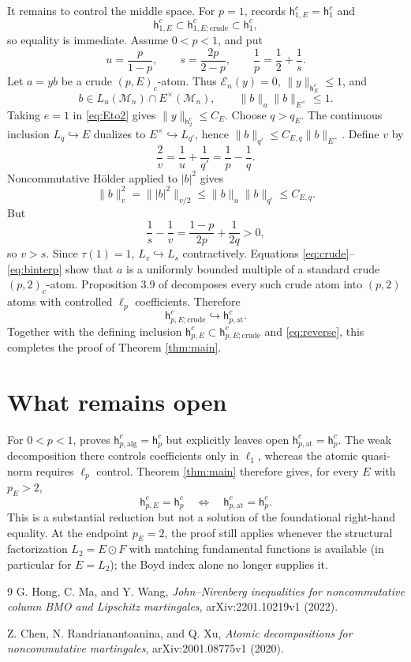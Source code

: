 \documentclass[11pt]{article}
\newcommand{\M}{\mathcal M}
\newcommand{\E}{\mathcal E}
\newcommand{\hpat}{\mathsf h^c_{p,\mathrm{at}}}
\newcommand{\tr}{\tau}
\begin{document}
It remains to control the middle space.  For $p=1$, \cite{HMW} records
$\mathsf h^c_{1,E}=\mathsf h^c_1$ and
\[
 \mathsf h^c_{1,E}\subset
 \mathsf h^c_{1,E;\mathrm{crude}}\subset\mathsf h^c_1,
\]
so equality is immediate.  Assume $0<p<1$, and put
\[
 u=\frac p{1-p},\qquad s=\frac{2p}{2-p},
 \qquad \frac1p=\frac12+\frac1s.
\]
Let $a=yb$ be a crude $(p,E)_c$-atom.  Thus $\E_n(y)=0$,
$\|y\|_{\mathsf h_E^c}\le1$, and
\begin{equation}\label{eq:crude}
 b\in L_u(\M_n)\cap E^\times(\M_n),\qquad
 \|b\|_u\|b\|_{E^\times}\le1.
\end{equation}
Taking $e=1$ in \eqref{eq:Eto2} gives
$\|y\|_{\mathsf h_2^c}\le C_E$.  Choose $q>q_E$.  The continuous inclusion
$L_q\hookrightarrow E$ dualizes to $E^\times\hookrightarrow L_{q'}$, hence
$\|b\|_{q'}\le C_{E,q}\|b\|_{E^\times}$.  Define $v$ by
\[
 \frac2v=\frac1u+\frac1{q'}=\frac1p-\frac1q.
\]
Noncommutative Hölder applied to $|b|^2$ gives
\begin{equation}\label{eq:binterp}
 \|b\|_v^2=\||b|^2\|_{v/2}
 \le\|b\|_u\|b\|_{q'}
 \le C_{E,q}.
\end{equation}
But
\[
 \frac1s-\frac1v=\frac{1-p}{2p}+\frac1{2q}>0,
\]
so $v>s$.  Since $\tr(1)=1$, $L_v\hookrightarrow L_s$ contractively.
Equations \eqref{eq:crude}--\eqref{eq:binterp} show that $a$ is a uniformly
bounded multiple of a standard crude $(p,2)_c$-atom.  Proposition 3.9 of
\cite{CRX} decomposes every such crude atom into $(p,2)$ atoms with controlled
$\ell_p$ coefficients.  Therefore
\[
 \mathsf h^c_{p,E;\mathrm{crude}}\hookrightarrow\hpat.
\]
Together with the defining inclusion
$\mathsf h^c_{p,E}\subset\mathsf h^c_{p,E;\mathrm{crude}}$ and
\eqref{eq:reverse}, this completes the proof of Theorem \ref{thm:main}.

\section{What remains open}

For $0<p<1$, \cite{CRX} proves
$\mathsf h^c_{p,\mathrm{alg}}=\mathsf h^c_p$ but explicitly leaves open
$\hpat=\mathsf h^c_p$.  The weak decomposition there controls coefficients
only in $\ell_1$, whereas the atomic quasi-norm requires $\ell_p$ control.
Theorem \ref{thm:main} therefore gives, for every $E$ with $p_E>2$,
\[
 \mathsf h^c_{p,E}=\mathsf h^c_p
 \quad\Longleftrightarrow\quad
 \mathsf h^c_{p,\mathrm{at}}=\mathsf h^c_p.
\]
This is a substantial reduction but not a solution of the foundational
right-hand equality.  At the endpoint $p_E=2$, the proof still applies whenever
the structural factorization $L_2=E\odot F$ with matching fundamental
functions is available (in particular for $E=L_2$); the Boyd index alone no
longer supplies it.

\begin{thebibliography}{9}
G. Hong, C. Ma, and Y. Wang,
\emph{John--Nirenberg inequalities for noncommutative column BMO and
Lipschitz martingales}, arXiv:2201.10219v1 (2022).

Z. Chen, N. Randrianantoanina, and Q. Xu,
\emph{Atomic decompositions for noncommutative martingales},
arXiv:2001.08775v1 (2020).
\end{thebibliography}
\end{document}
